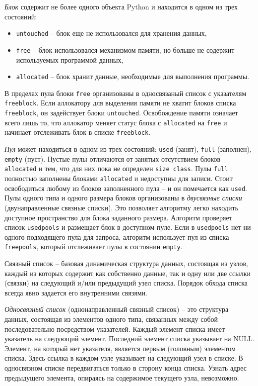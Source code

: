 \documentclass[%
	11pt,
	a4paper,
	utf8,
		]{article}
\begin{document}
\emph{Блок} содержит не более одного объекта Python и находится в одном из трех состояний:
\begin{itemize}
	\item \texttt{untouched} -- блок еще не использовался для хранения данных,
	
	\item \texttt{free} -- блок использовался механизмом памяти, но больше не содержит используемых программой данных,
	
	\item \texttt{allocated} -- блок хранит данные, необходимые для выполнения программы.
\end{itemize}

В пределах пула блоки \texttt{free} организованы в односвязаный список с указателям \texttt{freeblock}. Если аллокатору для выделения памяти не хватит блоков списка \texttt{freeblock}, он задействует блоки \texttt{untouched}. Освобождение памяти означает всего лишь то, что аллокатор меняет статус блока с \texttt{allocated} на \texttt{free} и начинает отслеживать блок в списке \texttt{freeblock}.

\emph{Пул} может находиться в одном из трех состояний: \texttt{used} (занят), \texttt{full} (заполнен), \texttt{empty} (пуст). Пустые пулы отличаются от занятых отсутствием блоков \texttt{allocated} и тем, что для них пока не определен \texttt{size class}. Пулы \texttt{full} полностью заполнены блоками \texttt{allocated} и недоступны для записи. Стоит освободиться любому из блоков заполненного пула -- и он помечается как \texttt{used}. Пулы одного типа и одного размера блоков организованы в \emph{двусвязные списки} (двунаправленные связные списки). Это позволяет алгоритму легко находить доступное пространство для блока заданного размера. Алгоритм проверяет список \texttt{usedpools} и размещает блок в доступном пуле. Если в \texttt{usedpools} нет ни одного подходящего пула для запроса, алгоритм использует пул из списка \texttt{freepools}, который отслеживает пулы в состоянии \texttt{empty}.

Связный список -- базовая динамическая структура данных, состоящая из узлов, каждый из которых содержит как собственно данные, так и одну или две ссылки (связки) на следующий и/или предыдущий узел списка. Порядок обхода списка всегда явно задается его внутренними связями.

\emph{Односвязный список} (однонаправленный связный список) -- это структура данных, состоящая из элементов одного типа, связанных между собой последовательно посредством указателей. Каждый элемент списка имеет указатель на следующий элемент. Последний элемент списка указывает на NULL. Элемент, на который нет указателя, является первым (головным) элементом списка. Здесь ссылка в каждом узле указывает на следующий узел в списке. В односвязном списке передвигаться только в сторону конца списка. Узнать адрес предыдущего элемента, опираясь на содержимое текущего узла, невозможно.
\end{document}
